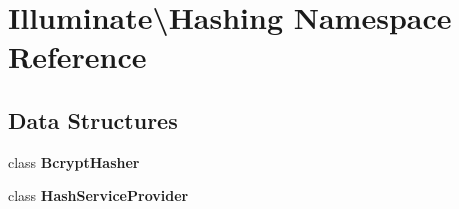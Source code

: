\section{Illuminate\textbackslash{}Hashing Namespace Reference}
\label{namespace_illuminate_1_1_hashing}
\subsection*{Data Structures}
\begin{DoxyCompactItemize}
\item 
class {\bf Bcrypt\+Hasher}
\item 
class {\bf Hash\+Service\+Provider}
\end{DoxyCompactItemize}
